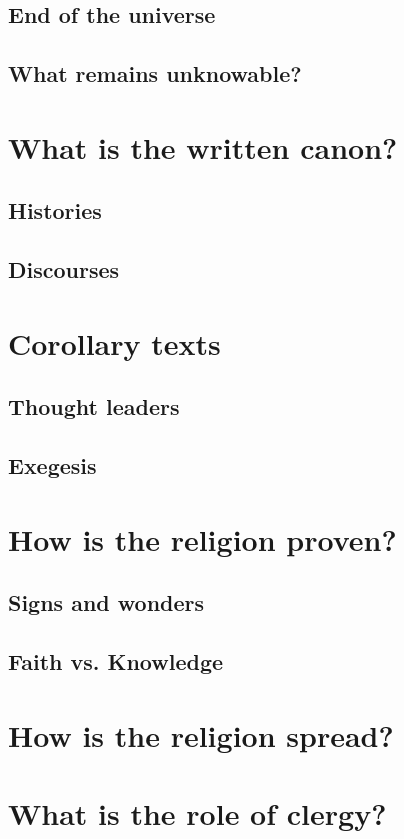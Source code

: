 \documentclass[12pt, letterpaper]{article}
\begin{document}
\subsection{End of the universe}

\subsection{What remains unknowable?}

\section{What is the written canon?}

\subsection{Histories}

\subsection{Discourses}

\section{Corollary texts}

\subsection{Thought leaders}

\subsection{Exegesis}

\section{How is the religion proven?}

\subsection{Signs and wonders}

\subsection{Faith vs. Knowledge}

\section{How is the religion spread?}

\section{What is the role of clergy?}





  
  
\end{document}
